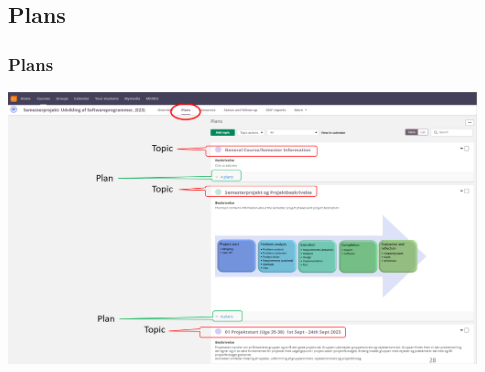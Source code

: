 \documentclass[t, aspectratio=169]{beamer}
\begin{document}
\subsection{Plans}
\begin{frame}[fragile]
  \frametitle{Plans}
  \begin{center}
    \includegraphics[width=124mm]{figs/itslearning/plans.png}
  \end{center}
%    
%    
%    
%    
\end{frame}
\end{document}
